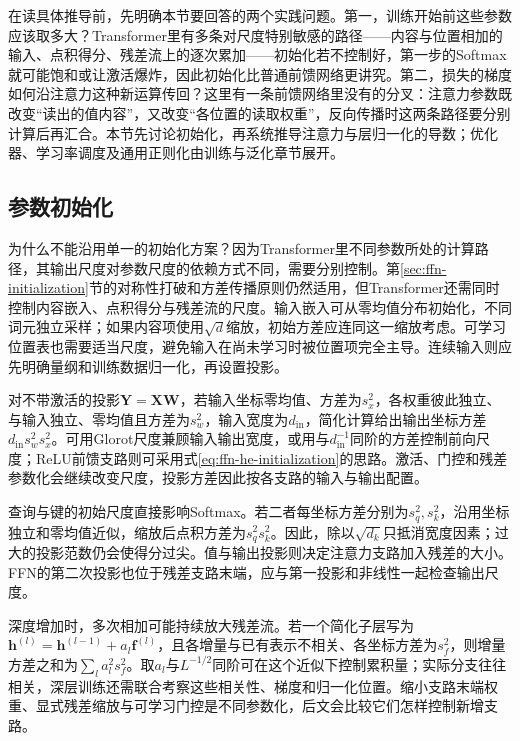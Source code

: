 在读具体推导前，先明确本节要回答的两个实践问题。第一，训练开始前这些参数应该取多大？Transformer里有多条对尺度特别敏感的路径——内容与位置相加的输入、点积得分、残差流上的逐次累加——初始化若不控制好，第一步的Softmax就可能饱和或让激活爆炸，因此初始化比普通前馈网络更讲究。第二，损失的梯度如何沿注意力这种新运算传回？这里有一条前馈网络里没有的分叉：注意力参数既改变“读出的值内容”，又改变“各位置的读取权重”，反向传播时这两条路径要分别计算后再汇合。本节先讨论初始化，再系统推导注意力与层归一化的导数；优化器、学习率调度及通用正则化由训练与泛化章节展开。

\subsection{参数初始化}
\label{sec:transformer-initialization}

为什么不能沿用单一的初始化方案？因为Transformer里不同参数所处的计算路径，其输出尺度对参数尺度的依赖方式不同，需要分别控制。第\ref{sec:ffn-initialization}节的对称性打破和方差传播原则仍然适用，但Transformer还需同时控制内容嵌入、点积得分与残差流的尺度。输入嵌入可从零均值分布初始化，不同词元独立采样；如果内容项使用$\sqrt d$缩放，初始方差应连同这一缩放考虑。可学习位置表也需要适当尺度，避免输入在尚未学习时被位置项完全主导。连续输入则应先明确量纲和训练数据归一化，再设置投影。

对不带激活的投影$\bm Y=\bm X\bm W$，若输入坐标零均值、方差为$s_x^2$，各权重彼此独立、与输入独立、零均值且方差为$s_w^2$，输入宽度为$d_{\mathrm{in}}$，简化计算给出输出坐标方差$d_{\mathrm{in}}s_w^2s_x^2$。可用Glorot尺度兼顾输入输出宽度，或用与$d_{\mathrm{in}}^{-1}$同阶的方差控制前向尺度；ReLU前馈支路则可采用式\eqref{eq:ffn-he-initialization}的思路。激活、门控和残差参数化会继续改变尺度，投影方差因此按各支路的输入与输出配置。

查询与键的初始尺度直接影响Softmax。若二者每坐标方差分别为$s_q^2,s_k^2$，沿用坐标独立和零均值近似，缩放后点积方差为$s_q^2s_k^2$。因此，除以$\sqrt{d_k}$只抵消宽度因素；过大的投影范数仍会使得分过尖。值与输出投影则决定注意力支路加入残差的大小。FFN的第二次投影也位于残差支路末端，应与第一投影和非线性一起检查输出尺度。

深度增加时，多次相加可能持续放大残差流。若一个简化子层写为$\bm h^{(l)}=\bm h^{(l-1)}+a_l\bm f^{(l)}$，且各增量与已有表示不相关、各坐标方差为$s_f^2$，则增量方差之和为$\sum_l a_l^2s_f^2$。取$a_l$与$L^{-1/2}$同阶可在这个近似下控制累积量；实际分支往往相关，深层训练还需联合考察这些相关性、梯度和归一化位置。缩小支路末端权重、显式残差缩放与可学习门控是不同参数化，后文会比较它们怎样控制新增支路。


